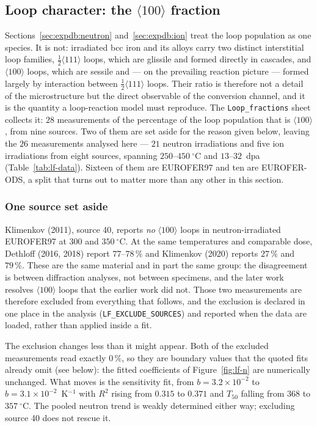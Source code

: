 \subsection{Loop character: the $\langle 100\rangle$ fraction}
\label{sec:expdb:fraction}

Sections~\ref{sec:expdb:neutron} and~\ref{sec:expdb:ion} treat the loop population
as one species. It is not: irradiated bcc iron and its alloys carry two distinct
interstitial loop families, $\frac{1}{2}\langle 111\rangle$ loops, which are glissile
and formed directly in cascades, and $\langle 100\rangle$ loops, which are sessile and
--- on the prevailing reaction picture --- formed largely by interaction between
$\frac{1}{2}\langle 111\rangle$ loops. Their ratio is therefore not a detail of the
microstructure but the direct observable of the conversion channel, and it is the
quantity a loop-reaction model must reproduce. The \texttt{Loop\_fractions} sheet
collects it: $28$ measurements of the percentage of the loop population that is
$\langle 100\rangle$, from nine sources. Two of them are set aside for the reason
given below, leaving the $26$ measurements analysed here --- $21$ neutron
irradiations and five ion irradiations from eight sources, spanning
$250$--$450~^{\circ}$C and $13$--$32$~dpa (Table~\ref{tab:lf-data}). Sixteen of them
are EUROFER97 and ten are EUROFER-ODS, a split that turns out to matter more than any
other in this section.

\subsubsection*{One source set aside}

Klimenkov (2011), source 40, reports \emph{no} $\langle 100\rangle$ loops in
neutron-irradiated EUROFER97 at $300$ and $350~^{\circ}$C. At the same temperatures
and comparable dose, Dethloff (2016, 2018) report $77$--$78\,\%$ and Klimenkov (2020)
reports $27\,\%$ and $79\,\%$. These are the same material and in part the same group:
the disagreement is between diffraction analyses, not between specimens, and the later
work resolves $\langle 100\rangle$ loops that the earlier work did not. Those two
measurements are therefore excluded from everything that follows, and the exclusion is
declared in one place in the analysis (\texttt{LF\_EXCLUDE\_SOURCES}) and reported when
the data are loaded, rather than applied inside a fit.

The exclusion changes less than it might appear. Both of the excluded measurements read
exactly $0\,\%$, so they are boundary values that the quoted fits already omit (see
below): the fitted coefficients of Figure~\ref{fig:lf-n} are numerically unchanged. What
moves is the sensitivity fit, from $b = 3.2\times10^{-2}$ to
$b = 3.1\times10^{-2}$~K$^{-1}$ with $R^2$ rising from $0.315$ to $0.371$ and $T_{50}$
falling from $368$ to $357~^{\circ}$C. The pooled neutron trend is weakly determined
either way; excluding source 40 does not rescue it.

